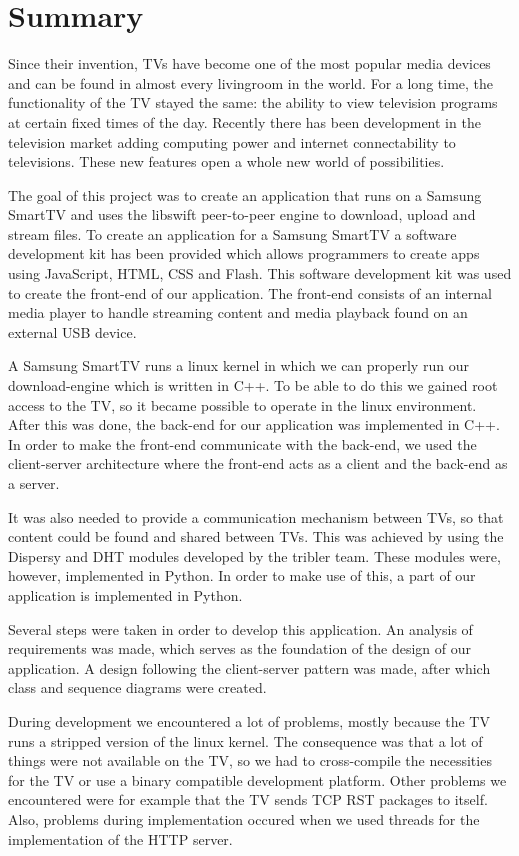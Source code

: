 \chapter*{Summary}
Since their invention, TV\textquotesingle s have become one of the most popular media devices and can be found in almost every livingroom in the 
world. For a long time, the functionality of the TV stayed the same: the ability to view television programs at certain fixed times of the day.
Recently there has been development in the television market adding computing power and internet connectability to televisions.
These new features open a whole new world of possibilities.

The goal of this project was to create an application that runs on a Samsung SmartTV and uses the libswift peer-to-peer engine to download, upload 
and stream files. To create an application for a Samsung SmartTV a software development kit has been provided which allows programmers to create 
apps using JavaScript, HTML, CSS and Flash. This software development kit was used to create the front-end of our application. 
The front-end consists of an internal media player to handle streaming content and media playback found
 on an external USB device.

A Samsung SmartTV runs a linux kernel in which we can properly run our download-engine which is written in C++.
To be able to do this we gained root access to the TV, so it became possible to operate in the linux environment. After this was done, the back-end for our application was implemented in C++. In order to make the front-end communicate with the back-end, we used the client-server architecture where the front-end acts as a client and the back-end as a server.

It was also needed to provide a communication mechanism between TV\textquotesingle s, so that content could be found and shared between TV\textquotesingle s. This was achieved by using the Dispersy and DHT modules developed by the
tribler team. These modules were, however, implemented in Python. In order to make use of this, a part of our application is implemented in Python.

Several steps were taken in order to develop this application. An analysis of requirements was made, which serves as the foundation of the design
of our application. A design following the client-server pattern was made, after which class and sequence diagrams were created.

During development we encountered a lot of problems, mostly because the TV runs a stripped version of the linux kernel. The consequence was that a
lot of things were not available on the TV, so we had to cross-compile the necessities for the TV or use a binary compatible development platform. 
Other problems we encountered were for example that the TV sends TCP RST packages to itself. Also, problems during implementation occured when we 
used threads for the implementation of the HTTP server.

